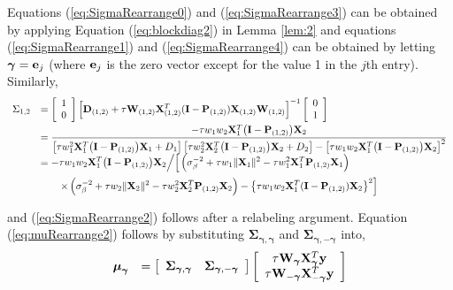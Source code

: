 \documentclass[11pt]{article}
\newtheorem{Main Result}{Main Result}
\def\vectorfontone{\bf}
\def\vectorfonttwo{\boldsymbol}
\def\ve{{\vectorfontone e}}                      %
\def\vu{{\vectorfontone u}}                      %
\def\vy{{\vectorfontone y}}                      %
\def\vgamma{{\vectorfonttwo \gamma}}             %
\def\vmu{{\vectorfonttwo \mu}}                   %
\def\matrixfontone{\bf}
\def\matrixfonttwo{\boldsymbol}
\def\mD{{\matrixfontone D}}                      %
\def\mI{{\matrixfontone I}}                      %
\def\mP{{\matrixfontone P}}                      %
\def\mW{{\matrixfontone W}}                      %
\def\mX{{\matrixfontone X}}                      %
\def\mSigma{{\matrixfonttwo \Sigma}}             %
\def\ds{\displaystyle}
\begin{document}
\noindent
Equations (\ref{eq:SigmaRearrange0}) and (\ref{eq:SigmaRearrange3}) can be obtained by applying Equation (\ref{eq:blockdiag2}) in Lemma \ref{lem:2} and equations (\ref{eq:SigmaRearrange1}) and (\ref{eq:SigmaRearrange4}) can be obtained by letting $\vgamma=\ve_j$ (where $\ve_j$ is the zero vector except
for the value 1 in the $j$th entry). Similarly,
$$
\begin{array}{rl}
\ds \Sigma_{1,2}
& \ds =
\left[ \begin{array}{c} 1 \\ 0 \end{array} \right]
\left[\mD_{(1,2)} + \tau\mW_{(1,2)}\mX_{(1,2)}^T
(\mI - \mP_{(1,2)})\mX_{(1,2)}\mW_{(1,2)} \right]^{-1}
\left[ \begin{array}{c} 0 \\ 1 \end{array} \right]
\\ [2ex]
& \ds =
\frac{-\tau w_1 w_2\mX_1^T\big(\mI - \mP_{(1,2)}\big)\mX_2}{\left[
	\tau w_1^2 \mX_1^T\big(\mI - \mP_{(1,2)}\big)\mX_1 + D_1
	\right]\left[
	\tau w_2^2 \mX_2^T\big(\mI - \mP_{(1,2)}\big)\mX_2 + D_2
	\right] - \left[\tau w_1 w_2\mX_1^T\big(\mI - \mP_{(1,2)}\big)\mX_2\right]^2_{{{{}}}} }
\\ [2ex]
& \ds = -\tau w_1 w_2\mX_1^T\big(\mI - \mP_{(1,2)}\big)\mX_2
\Big/
\Big[ \left(
\sigma_\beta^{-2} + \tau w_1\|\mX_1\|^2 - \tau w_1^2\mX_1^T\mP_{(1,2)}\mX_1
\right)
\\ [2ex]
& \ds \qquad
\times \left(
\sigma_\beta^{-2} + \tau w_2\|\mX_2\|^2 - \tau w_2^2\mX_2^T\mP_{(1,2)}\mX_2
\right) - \big\{\tau w_1 w_2\mX_1^T(\mI - \mP_{(1,2)})\mX_2\big\}^2 \Big]
\end{array}
$$

\noindent and (\ref{eq:SigmaRearrange2}) follows after a relabeling argument. Equation (\ref{eq:muRearrange2}) follows by substituting $\mSigma_{\vgamma,\vgamma}$ and $\mSigma_{\vgamma,-\vgamma}$ into,
$$
\begin{array}{rl}
\ds \vmu_{\vgamma}
& \ds = \left[ \begin{array}{cc}
\mSigma_{\vgamma,\vgamma}    & \mSigma_{\vgamma,-\vgamma}
\end{array}
\right]
\left[ \begin{array}{c}
\tau \mW_{\vgamma}\mX_{\vgamma}^T\vy \\
\tau \mW_{-\vgamma}\mX_{-\vgamma}^T\vy
\end{array} \right]
\end{array}
$$
\end{document}
